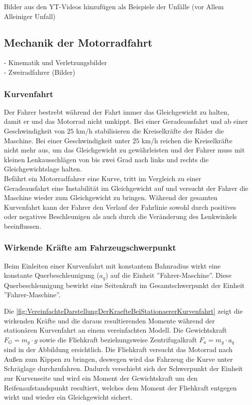 Bilder aus den YT-Videos hinzufügen als Beispiele der Unfälle (vor Allem Alleiniger Unfall)


\subsection{Mechanik der Motorradfahrt} %
- Kinematik und Verletzungsbilder\\
- Zweiradfahrer (Bilder)

\subsubsection{Kurvenfahrt} 

Der Fahrer bestrebt während der Fahrt immer das Gleichgewicht zu halten, damit er und das Motorrad nicht umkippt. Bei einer Geradeausfahrt und ab einer Geschwindigkeit von $25$ km/h stabilisieren die Kreiselkräfte der Räder die Maschine. Bei einer Geschwindigkeit unter $25$ km/h reichen die Kreiselkräfte nicht mehr aus, um das Gleichgewicht zu gewährleisten und der Fahrer muss mit kleinen Lenkausschlägen von bis zwei Grad nach links und rechts die Gleichgewichtslage halten.\\
Befährt ein Motorradfahrer eine Kurve, tritt im Vergleich zu einer Geradeausfahrt eine Instabilität im Gleichgewicht auf und versucht der Fahrer die Maschine wieder zum Gleichgewicht zu bringen. Während der gesamten Kurvenfahrt kann der Fahrer den Verlauf der Fahrlinie sowohl durch positives oder negatives Beschleunigen als auch durch die Veränderung des Lenkwinkels beeinflussen. \citep{Haedrich2012} 


\subsubsection{Wirkende Kräfte am Fahrzeugschwerpunkt}

Beim Einleiten einer Kurvenfahrt mit konstantem Bahnradius wirkt eine konstante Querbeschleunigung ($a_q$) auf die Einheit ''Fahrer-Maschine''. Diese Querbeschleunigung bewirkt eine Seitenkraft im Gesamtschwerpunkt der Einheit ''Fahrer-Maschine''. %

Die \autoref{fig:VereinfachteDarstellungDerKraefteBeiStationaererKurvenfahrt} zeigt die wirkenden Kräfte und die daraus resultierenden Momente während der stationären Kurvenfahrt an einem vereinfachten Modell. Die Gewichtskraft $F_G = m_g \cdot g$ sowie die Fliehkraft beziehungsweise Zentrifugalkraft $F_a = m_g \cdot a_q$ sind in der Abbildung ersichtlich. Die Fliehkraft versucht das Motorrad nach Außen zum Kippen zu bringen, deswegen wird das Fahrzeug die Kurve unter Schräglage durchzufahren. Dadurch verschiebt sich der Schwerpunkt der Einheit zur Kurvenseite und wird ein Moment der Gewichtskraft um den Reifenaufstandspunkt resultiert, welches dem Moment der Fliehkraft entgegen wirkt und wieder ein Gleichgewicht sichert.

